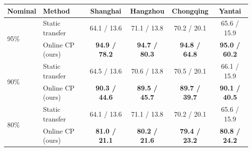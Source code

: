 \begin{tabular}{llcccc}
\toprule
Nominal & Method & Shanghai & Hangzhou & Chongqing & Yantai \\
\midrule
\multirow{2}{*}{95\%} & Static transfer & 64.1 / 13.6 & 71.1 / 13.8 & 70.2 / 20.1 & 65.6 / 15.9 \\
 & Online CP (ours) & \textbf{94.9 / 78.2} & \textbf{94.7 / 80.3} & \textbf{94.8 / 64.8} & \textbf{95.0 / 60.2} \\
\midrule
\multirow{2}{*}{90\%} & Static transfer & 64.5 / 13.6 & 70.6 / 13.8 & 70.5 / 20.1 & 66.1 / 15.9 \\
 & Online CP (ours) & \textbf{90.3 / 44.6} & \textbf{89.5 / 45.7} & \textbf{89.7 / 39.7} & \textbf{90.1 / 40.5} \\
\midrule
\multirow{2}{*}{80\%} & Static transfer & 64.1 / 13.6 & 71.1 / 13.8 & 70.2 / 20.1 & 65.6 / 15.9 \\
 & Online CP (ours) & \textbf{81.0 / 21.1} & \textbf{80.2 / 21.6} & \textbf{79.4 / 23.2} & \textbf{80.8 / 24.2} \\
\bottomrule
\end{tabular}
